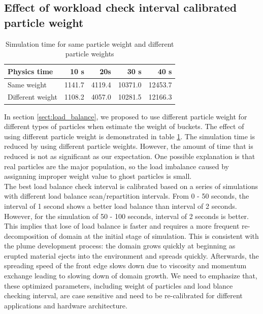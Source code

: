 \documentclass[procedia]{easychair}
\begin{document}
\subsection{Effect of workload check interval calibrated particle weight}
\begin{table}[htp]
	\begin{centering}
      \caption{Simulation time for same particle weight and different particle weights }		
	  \begin{tabular}{lrrrr}
	    \hline
	    Physics time & 10 s & 20s & 30 s & 40 s \\
	    \hline
	    Same weight & 1141.7 & 4119.4 & 10371.0 & 12453.7\\
	    Different weight & 1108.2 & 4057.0 & 10281.5 & 12166.3\\
	    \hline
	  \end{tabular}
	  \label{tab:same_diff_particle_weight}
	\end{centering}
\end{table}
In section \ref{sect:load_balance}, we proposed to use different particle weight for different types of particles when estimate the weight of buckets. The effect of using different particle weight is demonstrated in table \ref{tab:same_diff_particle_weight}. The simulation time is reduced by using different particle weights. However, the amount of time that is reduced is not as significant as our expectation. One possible explanation is that real particles are the major population, so the load imbalance caused by assignning improper weight value to ghost particles is small.\\
The best load balance check interval is calibrated based on a series of simulations with different load balance scan/repartition intervals. From 0 - 50 seconds, the interval of 1 second shows a better load balance than interval of 2 seconds. However, for the simulation of 50 - 100 seconds, interval of 2 seconds is better. This implies that lose of load balance is faster and requires a more frequent re-decomposition of domain at the initial stage of simulation. This is consistent with the plume development process: the domain grows quickly at beginning as erupted material ejects into the environment and spreads quickly. Afterwards, the spreading speed of the front edge slows down due to viscosity and momentum exchange leading to slowing down of domain growth. We need to emphasize that, these optimized parameters, including weight of particles and load blance checking interval, are case sensitive and need to be re-calibrated for different applications and hardware architecture.
%
\end{document}
